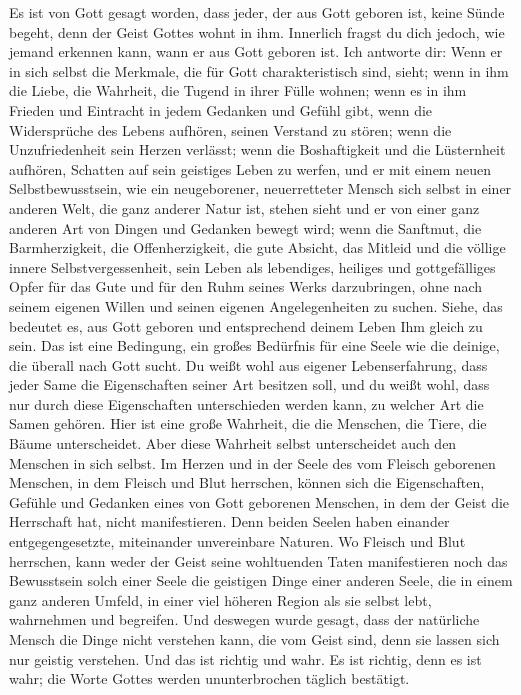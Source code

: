 Es ist von Gott gesagt worden, dass jeder, der aus Gott geboren ist, keine Sünde begeht, denn der Geist Gottes wohnt in ihm. Innerlich fragst du dich jedoch, wie jemand erkennen kann, wann er aus Gott geboren ist. Ich antworte dir: Wenn er in sich selbst die Merkmale, die für Gott charakteristisch sind, sieht; wenn in ihm die Liebe, die Wahrheit, die Tugend in ihrer Fülle wohnen; wenn es in ihm Frieden und Eintracht in jedem Gedanken und Gefühl gibt, wenn die Widersprüche des Lebens aufhören, seinen Verstand zu stören; wenn die Unzufriedenheit sein Herzen verlässt; wenn die Boshaftigkeit und die Lüsternheit aufhören, Schatten auf sein geistiges Leben zu werfen, und er mit einem neuen Selbstbewusstsein, wie ein neugeborener, neuerretteter Mensch sich selbst in einer anderen Welt, die ganz anderer Natur ist, stehen sieht und er von einer ganz anderen Art von Dingen und Gedanken bewegt wird; wenn die Sanftmut, die Barmherzigkeit, die Offenherzigkeit, die gute Absicht, das Mitleid und die völlige innere Selbstvergessenheit, sein Leben als lebendiges, heiliges und gottgefälliges Opfer für das Gute und für den Ruhm seines Werks darzubringen, ohne nach seinem eigenen Willen und seinen eigenen Angelegenheiten zu suchen. Siehe, das bedeutet es, aus Gott geboren und entsprechend deinem Leben Ihm gleich zu sein. Das ist eine Bedingung, ein großes Bedürfnis für eine Seele wie die deinige, die überall nach Gott sucht. Du weißt wohl aus eigener Lebenserfahrung, dass jeder Same die Eigenschaften seiner Art besitzen soll, und du weißt wohl, dass nur durch diese Eigenschaften unterschieden werden kann, zu welcher Art die Samen gehören. Hier ist eine große Wahrheit, die die Menschen, die Tiere, die Bäume unterscheidet. Aber diese Wahrheit selbst unterscheidet auch den Menschen in sich selbst. Im Herzen und in der Seele des vom Fleisch geborenen Menschen, in dem Fleisch und Blut herrschen, können sich die Eigenschaften, Gefühle und Gedanken eines von Gott geborenen Menschen, in dem der Geist die Herrschaft hat, nicht manifestieren. Denn beiden Seelen haben einander entgegengesetzte, miteinander unvereinbare Naturen. Wo Fleisch und Blut herrschen, kann weder der Geist seine wohltuenden Taten manifestieren noch das Bewusstsein solch einer Seele die geistigen Dinge einer anderen Seele, die in einem ganz anderen Umfeld, in einer viel höheren Region als sie selbst lebt, wahrnehmen und begreifen. Und deswegen wurde gesagt, dass der natürliche Mensch die Dinge nicht verstehen kann, die vom Geist sind, denn sie lassen sich nur geistig verstehen. Und das ist richtig und wahr. Es ist richtig, denn es ist wahr; die Worte Gottes werden ununterbrochen täglich bestätigt.

